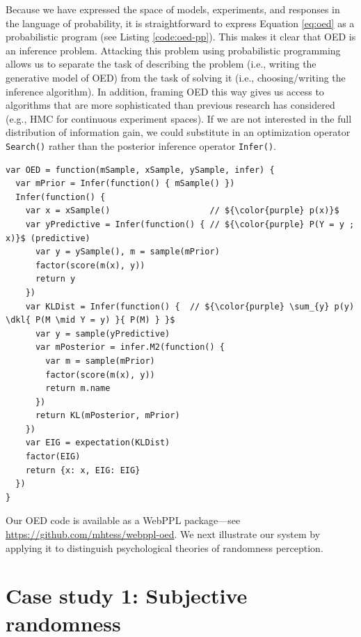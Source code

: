\documentclass{article}
\newcommand{\dkl}{D_\mathrm{KL}\infdivx}
\newcommand{\lou}[1]{\textcolor{orange}{[lou: #1]}}
\begin{document}
Because we have expressed the space of models, experiments, and responses in the language of probability, it is straightforward to express Equation \ref{eq:oed} as a probabilistic program (see Listing \ref{code:oed-pp}).
This makes it clear that OED is an inference problem.
Attacking this problem using probabilistic programming allows us to separate the task of describing the problem (i.e., writing the generative model of OED) from the task of solving it (i.e., choosing/writing the inference algorithm).
In addition, framing OED this way gives us access to algorithms that are more sophisticated than previous research has considered  (e.g., HMC for continuous experiment spaces).
If we are not interested in the full distribution of information gain, we could substitute in an optimization operator \lstinline{Search()} rather than the posterior inference operator \lstinline{Infer()}.

\begin{lstlisting}[mathescape, label={code:oed-pp}, caption = {OED implementation. For clarity, we have omitted some book-keeping details.}]
var OED = function(mSample, xSample, ySample, infer) {
  var mPrior = Infer(function() { mSample() })
  Infer(function() {
    var x = xSample()                    // ${\color{purple} p(x)}$
    var yPredictive = Infer(function() { // ${\color{purple} P(Y = y ; x)}$ (predictive)
      var y = ySample(), m = sample(mPrior)
      factor(score(m(x), y))
      return y
    })
    var KLDist = Infer(function() {  // ${\color{purple} \sum_{y} p(y) \dkl{ P(M \mid Y = y) }{ P(M) } }$
      var y = sample(yPredictive)
      var mPosterior = infer.M2(function() {
        var m = sample(mPrior)
        factor(score(m(x), y))
        return m.name
      })
      return KL(mPosterior, mPrior)
    })
    var EIG = expectation(KLDist)
    factor(EIG)
    return {x: x, EIG: EIG}
  })
}
\end{lstlisting}
Our OED code is available as a WebPPL package---see \url{https://github.com/mhtess/webppl-oed}.
We next illustrate our system by applying it to distinguish psychological theories of randomness perception.

\section{Case study 1: Subjective randomness}
\label{s:tutorial}
\end{document}
